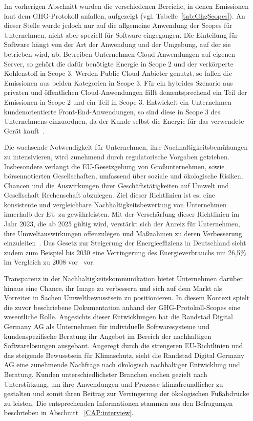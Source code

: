 Im vorherigen Abschnitt wurden die verschiedenen Bereiche, in denen Emissionen laut dem \ac{GHG}-Protokoll anfallen, aufgezeigt (vgl. Tabelle~\ref{tab:GhgScopes}).
An dieser Stelle wurde jedoch nur auf die allgemeine Anwendung der Scopes für Unternehmen, nicht aber speziell für Software eingegangen.
Die Einteilung für Software hängt von der Art der Anwendung und der Umgebung, auf der sie betrieben wird, ab.
Betreiben Unternehmen Cloud-Anwendungen auf eigenen Server, so gehört die dafür benötigte Energie in Scope 2 und der verkörperte Kohlenstoff in Scope 3.
Werden Public Cloud-Anbieter genutzt, so fallen die Emissionen aus beiden Kategorien in Scope 3.
Für ein hybrides Szenario aus privaten und öffentlichen Cloud-Anwendungen fällt dementsprechend ein Teil der Emissionen in Scope 2 und ein Teil in Scope 3.
Entwickelt ein Unternehmen kundenorientierte Front-End-Anwendungen, so sind diese in Scope 3 des Unternehmens einzuordnen, da der Kunde selbst die Energie für das verwendete Gerät kauft~\cite{GreenSoftwareFoundation.2022}.

Die wachsende Notwendigkeit für Unternehmen, ihre Nachhaltigkeitsbemühungen zu intensivieren, wird zunehmend durch regulatorische Vorgaben getrieben.
Insbesondere verlangt die EU-Gesetzgebung von Großunternehmen, sowie börsennotierten Gesellschaften, umfassend über soziale und ökologische Risiken, Chancen und die Auswirkungen ihrer Geschäftstätigkeiten auf Umwelt und Gesellschaft Rechenschaft abzulegen.
Ziel dieser Richtlinien ist es, eine konsistente und vergleichbare Nachhaltigkeitsbewertung von Unternehmen innerhalb der EU zu gewährleisten.
Mit der Verschärfung dieser Richtlinien im Jahr 2023, die ab 2025 gültig wird, verstärkt sich der Anreiz für Unternehmen, ihre Umweltauswirkungen offenzulegen und Maßnahmen zu deren Verbesserung einzuleiten~\cite{DirectorateGeneralforFinancialStability.20240411T13:37:55.000Z}.
Das Gesetz zur Steigerung der Energieeffizienz in Deutschland sieht zudem zum Beispiel bis 2030 eine Verringerung des Energieverbrauchs um 26,5\% im Vergleich zu 2008 vor~\cite{BundesministeriumderJustiz.20240418} vor.

Transparenz in der Nachhaltigkeitskommunikation bietet Unternehmen darüber hinaus eine Chance, ihr Image zu verbessern und sich auf dem Markt als Vorreiter in Sachen Umweltbewusstsein zu positionieren.
In diesem Kontext spielt die zuvor beschriebene Dokumentation anhand der GHG-Protokoll-Scopes eine wesentliche Rolle.
Angesichts dieser Entwicklungen hat die Randstad Digital Germany AG als Unternehmen für individuelle Softwaresysteme und kundenspezifische Beratung ihr Angebot im Bereich der nachhaltigen Softwarelösungen ausgebaut.
Angeregt durch die strengeren EU-Richtlinien und das steigende Bewusstsein für Klimaschutz, sieht die Randstad Digital Germany AG eine zunehmende Nachfrage nach ökologisch nachhaltiger Entwicklung und Beratung.
Kunden unterschiedlichster Branchen suchen gezielt nach Unterstützung, um ihre Anwendungen und Prozesse klimafreundlicher zu gestalten und somit ihren Beitrag zur Verringerung der ökologischen Fußabdrücke zu leisten.
Die entsprechenden Informationen stammen aus den Befragungen beschrieben in Abschnitt ~\ref{CAP:interview}.

